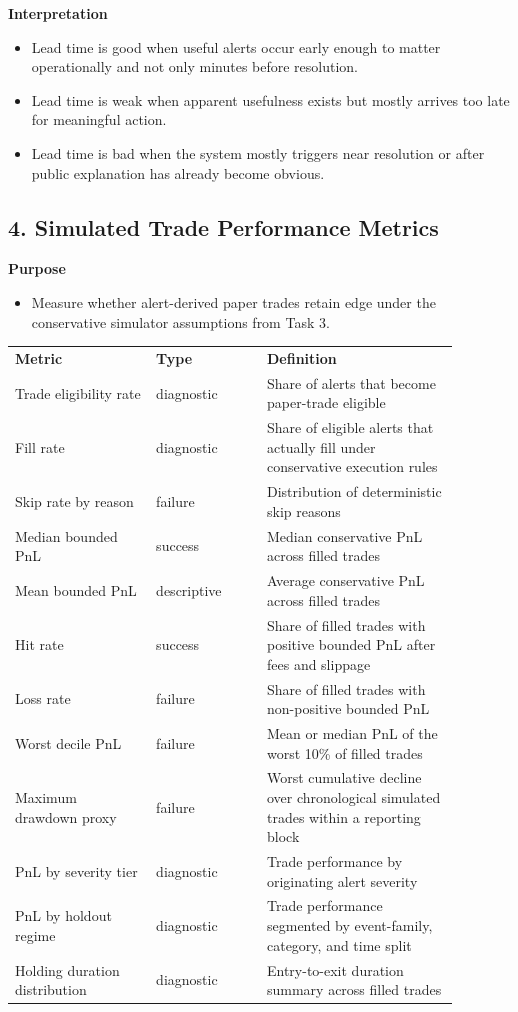 \documentclass{article}
\begin{document}
\textbf{Interpretation}
\begin{itemize}
\item Lead time is good when useful alerts occur early enough to matter operationally and not only minutes before resolution.
\item Lead time is weak when apparent usefulness exists but mostly arrives too late for meaningful action.
\item Lead time is bad when the system mostly triggers near resolution or after public explanation has already become obvious.
\end{itemize}

\subsection*{4. Simulated Trade Performance Metrics}

\textbf{Purpose}
\begin{itemize}
\item Measure whether alert-derived paper trades retain edge under the conservative simulator assumptions from Task 3.
\end{itemize}

\begin{longtable}{p{0.28\linewidth}p{0.22\linewidth}p{0.38\linewidth}}
\textbf{Metric} & \textbf{Type} & \textbf{Definition} \\
Trade eligibility rate & diagnostic & Share of alerts that become paper-trade eligible \\
Fill rate & diagnostic & Share of eligible alerts that actually fill under conservative execution rules \\
Skip rate by reason & failure & Distribution of deterministic skip reasons \\
Median bounded PnL & success & Median conservative PnL across filled trades \\
Mean bounded PnL & descriptive & Average conservative PnL across filled trades \\
Hit rate & success & Share of filled trades with positive bounded PnL after fees and slippage \\
Loss rate & failure & Share of filled trades with non-positive bounded PnL \\
Worst decile PnL & failure & Mean or median PnL of the worst 10\% of filled trades \\
Maximum drawdown proxy & failure & Worst cumulative decline over chronological simulated trades within a reporting block \\
PnL by severity tier & diagnostic & Trade performance by originating alert severity \\
PnL by holdout regime & diagnostic & Trade performance segmented by event-family, category, and time split \\
Holding duration distribution & diagnostic & Entry-to-exit duration summary across filled trades \\
\end{longtable}
\end{document}
